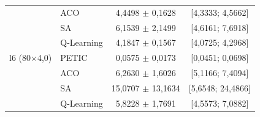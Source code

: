 \begin{table}[htb]
\begin{tabular}{llcc}
         & ACO & 4,4498 $\pm$ 0,1628 & [4,3333; 4,5662] \\
         & SA & 6,1539 $\pm$ 2,1499 & [4,6161; 7,6918] \\
         & Q-Learning & 4,1847 $\pm$ 0,1567 & [4,0725; 4,2968] \\
        \hline
        l6 (80$\times$4,0) & PETIC & 0,0575 $\pm$ 0,0173 & [0,0451; 0,0698] \\
         & ACO & 6,2630 $\pm$ 1,6026 & [5,1166; 7,4094] \\
         & SA & 15,0707 $\pm$ 13,1634 & [5,6548; 24,4866] \\
         & Q-Learning & 5,8228 $\pm$ 1,7691 & [4,5573; 7,0882] \\
        \hline
    \end{tabular}
\end{table}
